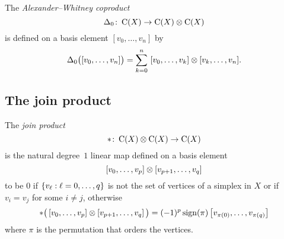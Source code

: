 The \textit{Alexander--Whitney coproduct}
\[
\Delta_0 \colon \operatorname{C}(X) \to \operatorname{C}(X) \otimes \operatorname{C}(X)
\]
is defined on a basis element $[v_0, \dots, v_n]$ by
\begin{equation*} \label{e:alexander-whitney coalgebra}
	\Delta_0 \big( [v_0, \dots, v_n] \big) =
	\sum_{k=0}^n \ [v_0, \dots, v_k] \otimes [v_k, \dots, v_n].
\end{equation*}

\subsection{The join product}

The \textit{join product}
\[
\ast \colon \operatorname{C}(X) \otimes \operatorname{C}(X) \to \operatorname{C}(X)
\]
is the natural degree~$1$ linear map defined on a basis element
\[
[v_0, \dots, v_p] \otimes [v_{p+1}, \dots, v_q]
\]
to be $0$ if $\{v_\ell : \ell = 0, \dots, q\}$ is not the set of vertices of a simplex in $X$ or if $v_i = v_j$ for some $i \neq j$,
otherwise
\[
\ast \big(\left[v_0, \dots, v_p \right] \otimes \left[v_{p+1}, \dots, v_q\right]\big) =
(-1)^{p} \operatorname{sign}(\pi) \left[v_{\pi(0)}, \dots, v_{\pi(q)}\right]
\]
where $\pi$ is the permutation that orders the vertices.

